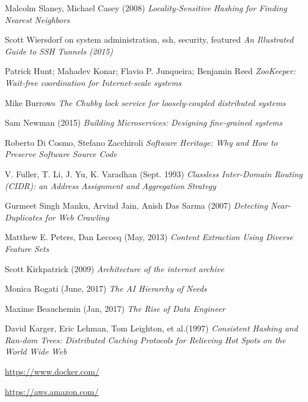 \begin{thebibliography}{9}
Malcolm Slaney, Michael Casey (2008)
\textit{Locality-Sensitive Hashing for Finding Nearest Neighbors}

Scott Wiersdorf on system administration, ssh, security, featured
\textit{An Illustrated Guide to SSH Tunnels (2015)}

Patrick Hunt; Mahadev Konar; Flavio P. Junqueira; Benjamin Reed
\textit{ZooKeeper: Wait-free coordination for Internet-scale systems}

Mike Burrows
\textit{The Chubby lock service for loosely-coupled distributed systems}

Sam Newman (2015)
\textit{Building Microservices: Designing fine-grained systems}

Roberto Di Cosmo, Stefano Zacchiroli
\textit{Software Heritage: Why and How to Preserve Software Source Code}

  V. Fuller, T. Li, J. Yu, K. Varadhan (Sept. 1993)
  \textit{Classless Inter-Domain Routing (CIDR): an Address Assignment and Aggregation Strategy}

  Gurmeet Singh Manku, Arvind Jain, Anish Das Sarma (2007)
  \textit{Detecting Near-Duplicates for Web Crawling}

  Matthew E. Peters, Dan Lecocq (May, 2013)
  \textit{Content Extraction Using Diverse Feature Sets}

  Scott Kirkpatrick (2009)
  \textit{Architecture of the internet archive}

  Monica Rogati (June, 2017)
  \textit{The AI Hierarchy of Needs}

  Maxime Beauchemin (Jan, 2017)
  \textit{The Rise of Data Engineer}

  David Karger, Eric Lehman, Tom Leighton, et al.(1997)
  \textit{Consistent Hashing and Ran‐dom Trees: Distributed Caching Protocols for Relieving Hot Spots on the World Wide Web}

\url{https://www.docker.com/}

\url{https://aws.amazon.com/}

\end{thebibliography}